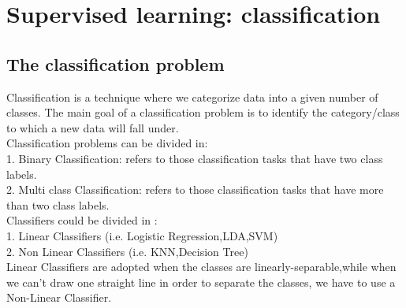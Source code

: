 \chapter{Supervised learning: classification}

\section{The classification problem}

Classification is a technique where we categorize data into a given number of classes. The main goal of a classification problem is to identify the category/class to which a new data will fall under.\noindent \\
Classification problems can be divided in: \noindent \\
1. Binary Classification: refers to those classification tasks that have two class labels.\noindent \\
2. Multi class Classification: refers to those classification tasks that have more than two class labels.\noindent \\
Classifiers could be divided in : \noindent \\
1. Linear Classifiers (i.e. Logistic Regression,LDA,SVM) \noindent \\
2. Non Linear Classifiers (i.e. KNN,Decision Tree) \noindent \\

Linear Classifiers are adopted when the classes are  linearly-separable,while when we can't draw one straight line in order to separate the classes, we have to use a Non-Linear Classifier.



